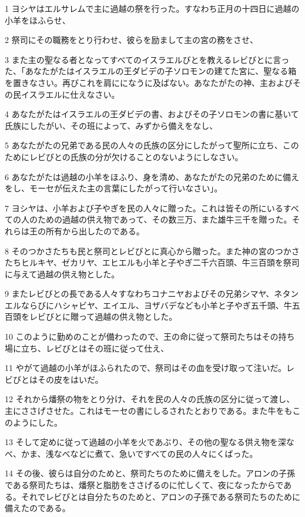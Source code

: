 \par 1 ヨシヤはエルサレムで主に過越の祭を行った。すなわち正月の十四日に過越の小羊をほふらせ、
\par 2 祭司にその職務をとり行わせ、彼らを励まして主の宮の務をさせ、
\par 3 また主の聖なる者となってすべてのイスラエルびとを教えるレビびとに言った、「あなたがたはイスラエルの王ダビデの子ソロモンの建てた宮に、聖なる箱を置きなさい。再びこれを肩にになうに及ばない。あなたがたの神、主およびその民イスラエルに仕えなさい。
\par 4 あなたがたはイスラエルの王ダビデの書、およびその子ソロモンの書に基いて氏族にしたがい、その班によって、みずから備えをなし、
\par 5 あなたがたの兄弟である民の人々の氏族の区分にしたがって聖所に立ち、このためにレビびとの氏族の分が欠けることのないようにしなさい。
\par 6 あなたがたは過越の小羊をほふり、身を清め、あなたがたの兄弟のために備えをし、モーセが伝えた主の言葉にしたがって行いなさい」。
\par 7 ヨシヤは、小羊および子やぎを民の人々に贈った。これは皆その所にいるすべての人のための過越の供え物であって、その数三万、また雄牛三千を贈った。それらは王の所有から出したのである。
\par 8 そのつかさたちも民と祭司とレビびとに真心から贈った。また神の宮のつかさたちヒルキヤ、ゼカリヤ、エヒエルも小羊と子やぎ二千六百頭、牛三百頭を祭司に与えて過越の供え物とした。
\par 9 またレビびとの長である人々すなわちコナニヤおよびその兄弟シマヤ、ネタンエルならびにハシャビヤ、エイエル、ヨザバデなども小羊と子やぎ五千頭、牛五百頭をレビびとに贈って過越の供え物とした。
\par 10 このように勤めのことが備わったので、王の命に従って祭司たちはその持ち場に立ち、レビびとはその班に従って仕え、
\par 11 やがて過越の小羊がほふられたので、祭司はその血を受け取って注いだ。レビびとはその皮をはいだ。
\par 12 それから燔祭の物をとり分け、それを民の人々の氏族の区分に従って渡し、主にささげさせた。これはモーセの書にしるされたとおりである。また牛をもこのようにした。
\par 13 そして定めに従って過越の小羊を火であぶり、その他の聖なる供え物を深なべ、かま、浅なべなどに煮て、急いですべての民の人々にくばった。
\par 14 その後、彼らは自分のためと、祭司たちのために備えをした。アロンの子孫である祭司たちは、燔祭と脂肪をささげるのに忙しくて、夜になったからである。それでレビびとは自分たちのためと、アロンの子孫である祭司たちのために備えたのである。
